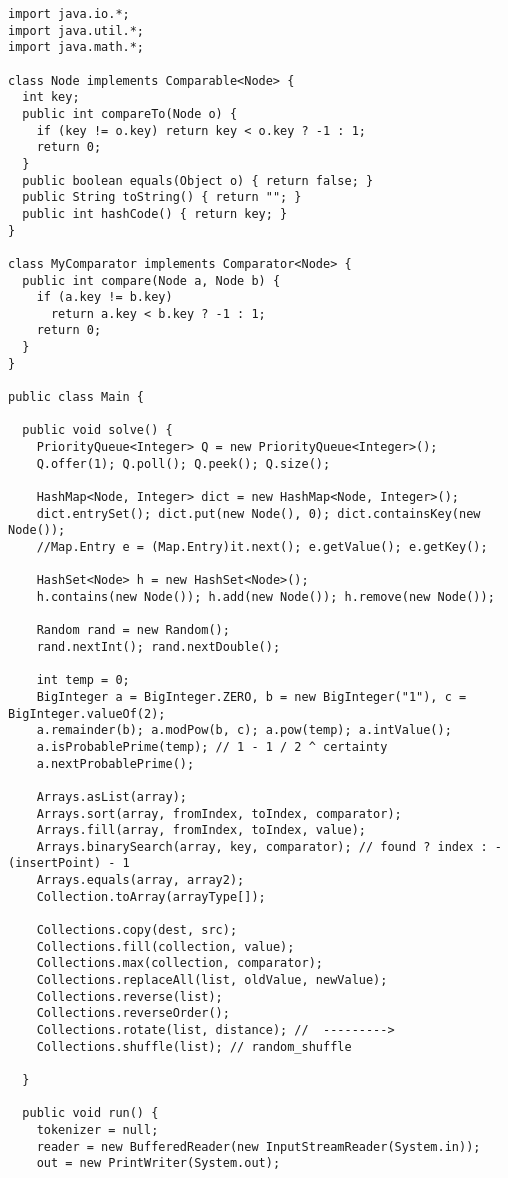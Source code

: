 \begin{lstlisting}
import java.io.*;
import java.util.*;
import java.math.*;

class Node implements Comparable<Node> {
  int key;
  public int compareTo(Node o) {
    if (key != o.key) return key < o.key ? -1 : 1;
    return 0;
  }
  public boolean equals(Object o) { return false; }
  public String toString() { return ""; }
  public int hashCode() { return key; }
}

class MyComparator implements Comparator<Node> {
  public int compare(Node a, Node b) {
    if (a.key != b.key)
      return a.key < b.key ? -1 : 1;
    return 0;
  }
}

public class Main {

  public void solve() {
    PriorityQueue<Integer> Q = new PriorityQueue<Integer>();
    Q.offer(1); Q.poll(); Q.peek(); Q.size();

    HashMap<Node, Integer> dict = new HashMap<Node, Integer>();
    dict.entrySet(); dict.put(new Node(), 0); dict.containsKey(new Node());
    //Map.Entry e = (Map.Entry)it.next(); e.getValue(); e.getKey();

    HashSet<Node> h = new HashSet<Node>();
    h.contains(new Node()); h.add(new Node()); h.remove(new Node());

    Random rand = new Random();
    rand.nextInt(); rand.nextDouble();

    int temp = 0;
    BigInteger a = BigInteger.ZERO, b = new BigInteger("1"), c = BigInteger.valueOf(2);
    a.remainder(b); a.modPow(b, c); a.pow(temp); a.intValue();
    a.isProbablePrime(temp); // 1 - 1 / 2 ^ certainty
    a.nextProbablePrime();

    Arrays.asList(array);
    Arrays.sort(array, fromIndex, toIndex, comparator);
    Arrays.fill(array, fromIndex, toIndex, value);
    Arrays.binarySearch(array, key, comparator); // found ? index : -(insertPoint) - 1
    Arrays.equals(array, array2);
    Collection.toArray(arrayType[]);

    Collections.copy(dest, src);
    Collections.fill(collection, value);
    Collections.max(collection, comparator);
    Collections.replaceAll(list, oldValue, newValue);
    Collections.reverse(list);
    Collections.reverseOrder();
    Collections.rotate(list, distance); //  --------->
    Collections.shuffle(list); // random_shuffle

  }

  public void run() {
    tokenizer = null;
    reader = new BufferedReader(new InputStreamReader(System.in));
    out = new PrintWriter(System.out);


\end{lstlisting}
